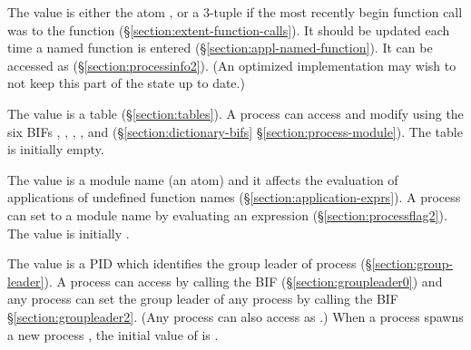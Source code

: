 \begin{Lentry}
\item[\T{current_function[\Z{P}]}]
The value is either the atom , or a
3-tuple  if the
most recently begin function call was to the function 
(\S\ref{section:extent-function-calls}).
It should be updated each time a named function is entered (\S\ref{section:appl-named-function}).
It can be accessed as 
(\S\ref{section:processinfo2}).
\ifNew
(An optimized implementation may wish to not keep this part of the state up to date.)
\fi
{}

\item[\T{dictionary[\Z{P}]}]
The value is a table (\S\ref{section:tables}).
A process can access and modify  using the six BIFs
, , , ,  and 
(\ifOld\S\ref{section:dictionary-bifs}\fi
\ifNew\S\ref{section:process-module}\fi).
The table is initially empty.

\item[\T{error_handler[\Z{P}]}]
The value is a module name (an atom) and it affects the evaluation of applications of
undefined function names (\S\ref{section:application-exprs})\iffalse and send expressions with
undefined process names (\S\ref{section:send-expr})\fi.
A process  can set  to a module name
 by evaluating an expression
(\S\ref{section:processflag2}).
The value is initially .

\item[\T{group_leader[\Z{P}]}]
The value is a PID which identifies the group leader of process 
(\S\ref{section:group-leader}).
A process  can access  by calling the BIF
 (\S\ref{section:groupleader0})
and any process can set the group leader of any
process by calling the BIF  \S\ref{section:groupleader2}.
(Any process can also access  as .)
When a process  spawns a new process , the initial value
of  is .


\end{Lentry}
